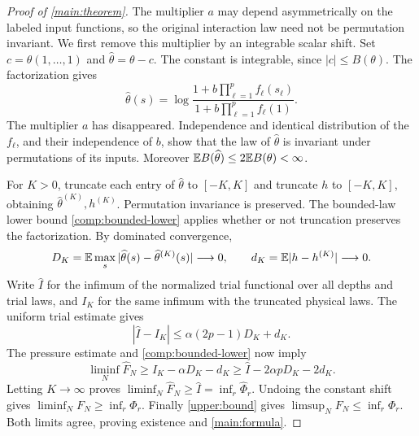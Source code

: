 \begin{proof}[Proof of \cref{main:theorem}]
The multiplier $a$ may depend asymmetrically on the labeled input functions,
so the original interaction law need not be permutation invariant.
We first remove this multiplier by an integrable scalar shift.
Set $c=\theta(1,\ldots,1)$ and $\widehat\theta=\theta-c$. The
constant is integrable, since $|c|\le B(\theta)$. The factorization gives
\[
 \widehat\theta(s)=
 \log\frac{1+b\prod_{\ell=1}^p f_\ell(s_\ell)}
 {1+b\prod_{\ell=1}^p f_\ell(1)}.
\]
The multiplier $a$ has disappeared. Independence and identical distribution
of the $f_\ell$, and their independence of $b$, show that the law of
$\widehat\theta$ is invariant under permutations of its inputs.
Moreover $\mathbb E B(\widehat\theta)\le2\mathbb E B(\theta)<\infty$.

For $K>0$, truncate each entry of $\widehat\theta$ to $[-K,K]$ and truncate
$h$ to $[-K,K]$, obtaining $\widehat\theta^{(K)},h^{(K)}$.
Permutation invariance is preserved. The bounded-law lower bound
\cref{comp:bounded-lower} applies whether or not truncation preserves the
factorization. By dominated convergence,
\[
 D_K=\mathbb E\max_s|\widehat\theta(s)-\widehat\theta^{(K)}(s)|\longrightarrow0,
 \qquad d_K=\mathbb E|h-h^{(K)}|\longrightarrow0.
\]
Write $\widehat I$ for the infimum of the normalized trial functional
over all depths and trial laws, and $I_K$ for the same infimum with
the truncated physical laws. The uniform trial estimate gives
\[
 |\widehat I-I_K|\le\alpha(2p-1)D_K+d_K.
\]
The pressure estimate and \cref{comp:bounded-lower} now imply
\[
 \liminf_N\widehat F_N
 \ge I_K-\alpha D_K-d_K
 \ge\widehat I-2\alpha pD_K-2d_K.
\]
Letting $K\to\infty$ proves
$\liminf_N\widehat F_N\ge\widehat I=\inf_r\widehat\Phi_r$.
Undoing the constant shift gives $\liminf_NF_N\ge\inf_r\Phi_r$.
Finally \cref{upper:bound} gives $\limsup_NF_N\le\inf_r\Phi_r$.
Both limits agree, proving existence and \eqref{main:formula}.
\end{proof}
